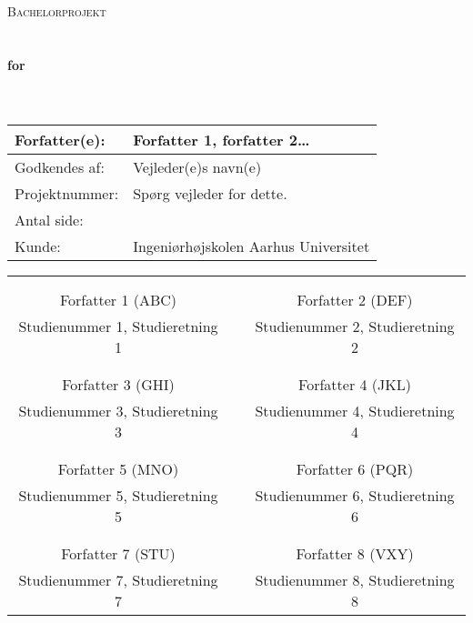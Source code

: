 \begin{center}

\textsc{\Large Bachelorprojekt}\\[0.25cm]


\HRule \\[0.4cm]

{ \huge \bfseries \DocumentType}\\[0.4cm]
{ \huge \bfseries for}\\[0.4cm] 
{ \huge \bfseries \ProjectName}\\[0.4cm]

\HRule \\[0.5cm]

\begin{tabular}{p{}|p{}}
\hline 
Forfatter(e): & Forfatter 1, forfatter 2\dots\\ 
\hline 
Godkendes af: & Vejleder(e)s navn(e) \\ 
\hline
Projektnummer: & Spørg vejleder for dette.\\
\hline
Antal side: & \pageref{LastPage} \\
\hline 
Kunde: & Ingeniørhøjskolen Aarhus Universitet \\
\hline
\end{tabular} 
\end{center}


\begin{tabular}{c p{} c}
&& \\
\signature & \qquad & \signature  \\ 
Forfatter 1 (ABC) & & Forfatter 2 (DEF)\\
Studienummer 1, Studieretning 1 & & Studienummer 2, Studieretning 2 \\

&& \\
\signature & \qquad & \signature  \\ 
Forfatter 3 (GHI)& & Forfatter 4 (JKL)\\
Studienummer 3, Studieretning 3 & & Studienummer 4, Studieretning 4\\

&& \\
\signature & \qquad & \signature  \\ 
Forfatter 5 (MNO) & & Forfatter 6 (PQR)\\
Studienummer 5, Studieretning 5 & & Studienummer 6, Studieretning 6\\

&& \\
\signature & \qquad & \signature  \\ 
Forfatter 7 (STU)& & Forfatter 8 (VXY)\\
Studienummer 7, Studieretning 7 & & Studienummer 8, Studieretning 8
\end{tabular} 